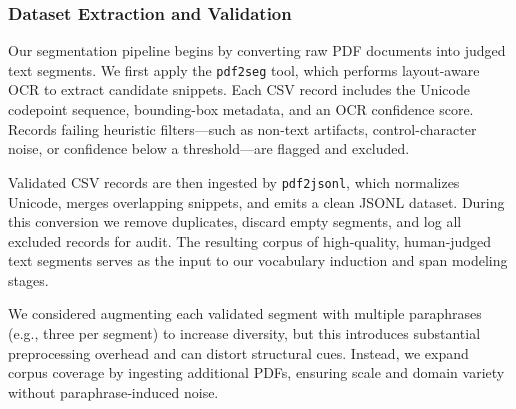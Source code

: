 \subsubsection{Dataset Extraction and Validation}
\label{sec:dataset-extraction}

Our segmentation pipeline begins by converting raw PDF documents into judged text segments.  We first apply the \texttt{pdf2seg} tool, which performs layout-aware OCR to extract candidate snippets.  Each CSV record includes the Unicode codepoint sequence, bounding-box metadata, and an OCR confidence score.  Records failing heuristic filters—such as non-text artifacts, control-character noise, or confidence below a threshold—are flagged and excluded.

Validated CSV records are then ingested by \texttt{pdf2jsonl}, which normalizes Unicode, merges overlapping snippets, and emits a clean JSONL dataset.  During this conversion we remove duplicates, discard empty segments, and log all excluded records for audit.  The resulting corpus of high‐quality, human‐judged text segments serves as the input to our vocabulary induction and span modeling stages.

We considered augmenting each validated segment with multiple paraphrases (e.g., three per segment) to increase diversity, but this introduces substantial preprocessing overhead and can distort structural cues.  Instead, we expand corpus coverage by ingesting additional PDFs, ensuring scale and domain variety without paraphrase‐induced noise.